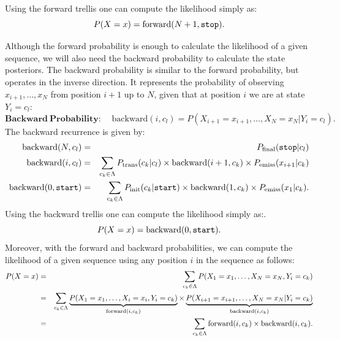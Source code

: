 Using the forward trellis one can compute the likelihood simply as:
\begin{equation}
\label{eq:forwardSum}
P(X=x) = \mathrm{forward}(N+1, \text{\tt stop}).
\end{equation}

Although the forward probability is enough to calculate the likelihood
of a given sequence, we will also need the backward probability to
calculate the state posteriors. 
The backward probability is similar to the forward probability, but operates in the inverse direction.
It 
represents the probability of observing $x_{i+1},\ldots,x_N$ from position $i+1$ up to $N$, given that at position $i$ we are at state $Y_i = c_l$:
 \begin{equation}
\label{eq::backward}
\mathbf{Backward \ Probability\!:}\;\;\;\;  \mathrm{backward}(i, c_l) = P(X_{i+1}=x_{i+1},\ldots, X_N=x_N | Y_i = c_l).
\end{equation}
The backward recurrence is given by:
\begin{eqnarray}
\mathrm{backward}(N, c_l) &=& P_{\mathrm{final}}(\text{\tt stop} | c_l) 
 \\
 \mathrm{backward}(i, c_l) &=&  \displaystyle \sum_{c_k \in \Lambda} P_{\mathrm{trans}}(c_k | c_l) \times \mathrm{backward}(i+1, c_k) \times P_{\mathrm{emiss}}(x_{i+1} | c_k)  \label{backwardRecursion}
 \\
  \mathrm{backward}(0, \text{\tt start}) &=& \sum_{c_k \in \Lambda} P_{\mathrm{init}}(c_k | \text{\tt start}) \times \mathrm{backward}(1, c_k) \times P_{\mathrm{emiss}}(x_{1} | c_k).
\end{eqnarray}
Using the backward trellis one can compute the likelihood simply as:.
\begin{equation}
\label{eq:backwardSum}
P(X=x) = \mathrm{backward}(0, \text{\tt start}).
\end{equation}
Moreover, with the forward and backward 
probabilities, we can compute the likelihood of a given sequence using any position $i$ in the sequence
as follows:
\begin{eqnarray}
\label{eq::fbsanity}
  P(X=x) &=& 
  \sum_{c_k \in \Lambda} P(X_1=x_1,\ldots, X_N=x_N,Y_i=c_k)\nonumber\\
  &=&
  \sum_{c_k \in \Lambda} 
  \underbrace{P(X_1=x_1,\ldots, X_i=x_i, Y_i=c_k)}_{\mathrm{forward}(i,c_k)} \times 
  \underbrace{P(X_{i+1}=x_{i+1},\ldots, X_N=x_N| Y_i=c_k)}_{\mathrm{backward}(i,c_k)}\nonumber\\
  &=& \sum_{c_k \in \Lambda} \mathrm{forward}(i,c_k) \times \mathrm{backward}(i,c_k).
\end{eqnarray}

